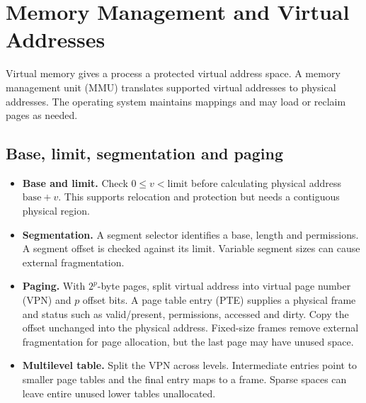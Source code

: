 \documentclass[12pt,a4paper]{article}
\begin{document}
\section{Memory Management and Virtual Addresses}
\begin{tcolorbox}[defbox,title={Virtual memory and address translation}]
Virtual memory gives a process a protected virtual address space. A memory management unit (MMU) translates supported virtual addresses to physical addresses. The operating system maintains mappings and may load or reclaim pages as needed.
\end{tcolorbox}

\subsection{Base, limit, segmentation and paging}
\begin{itemize}[leftmargin=*,itemsep=3pt]
\item \textbf{Base and limit.} Check $0\le v<\mathrm{limit}$ before calculating physical address $\mathrm{base}+v$. This supports relocation and protection but needs a contiguous physical region.
\item \textbf{Segmentation.} A segment selector identifies a base, length and permissions. A segment offset is checked against its limit. Variable segment sizes can cause external fragmentation.
\item \textbf{Paging.} With $2^p$-byte pages, split virtual address into virtual page number (VPN) and $p$ offset bits. A page table entry (PTE) supplies a physical frame and status such as valid/present, permissions, accessed and dirty. Copy the offset unchanged into the physical address. Fixed-size frames remove external fragmentation for page allocation, but the last page may have unused space.
\item \textbf{Multilevel table.} Split the VPN across levels. Intermediate entries point to smaller page tables and the final entry maps to a frame. Sparse spaces can leave entire unused lower tables unallocated.
\end{itemize}
\begin{tcolorbox}[tikzbox,title={Virtual page translation and unchanged offset},unbreakable]
\centering
{}
\end{tcolorbox}
\end{document}
